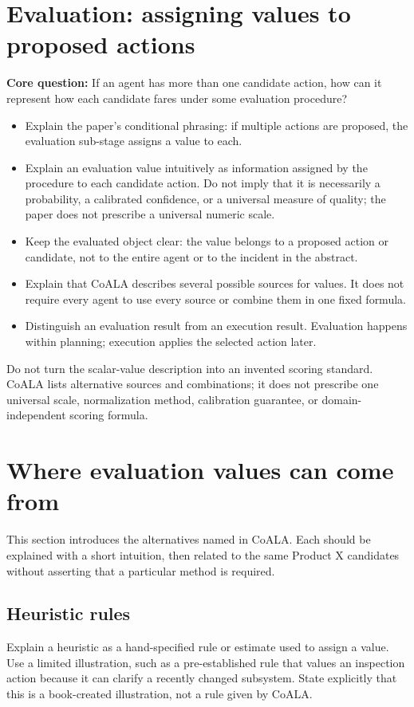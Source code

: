 \section{Evaluation: assigning values to proposed actions}
\textbf{Core question:} If an agent has more than one candidate action, how can it represent how each candidate fares under some evaluation procedure?
\begin{itemize}
  \item Explain the paper's conditional phrasing: if multiple actions are proposed, the evaluation sub-stage assigns a value to each.
  \item Explain an evaluation value intuitively as information assigned by the procedure to each candidate action. Do not imply that it is necessarily a probability, a calibrated confidence, or a universal measure of quality; the paper does not prescribe a universal numeric scale.
  \item Keep the evaluated object clear: the value belongs to a proposed action or candidate, not to the entire agent or to the incident in the abstract.
  \item Explain that CoALA describes several possible sources for values. It does not require every agent to use every source or combine them in one fixed formula.
  \item Distinguish an evaluation result from an execution result. Evaluation happens within planning; execution applies the selected action later.
\end{itemize}
\begin{notebox}
Do not turn the scalar-value description into an invented scoring standard. CoALA lists alternative sources and combinations; it does not prescribe one universal scale, normalization method, calibration guarantee, or domain-independent scoring formula.
\end{notebox}

\section{Where evaluation values can come from}
This section introduces the alternatives named in CoALA. Each should be explained with a short intuition, then related to the same Product X candidates without asserting that a particular method is required.
\subsection{Heuristic rules}
Explain a heuristic as a hand-specified rule or estimate used to assign a value. Use a limited illustration, such as a pre-established rule that values an inspection action because it can clarify a recently changed subsystem. State explicitly that this is a book-created illustration, not a rule given by CoALA.
